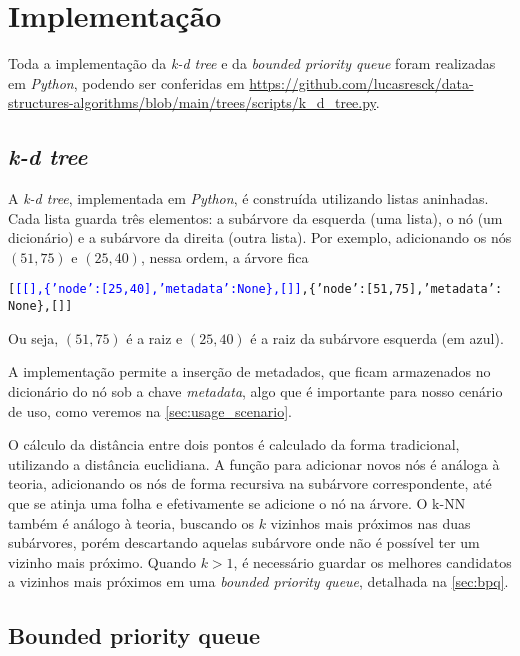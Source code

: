 \section{Implementação}

    Toda a implementação da \textit{k-d tree} e da \textit{bounded priority queue} foram realizadas em \textit{Python}, podendo ser conferidas em \url{https://github.com/lucasresck/data-structures-algorithms/blob/main/trees/scripts/k_d_tree.py}.

    \subsection{\textit{k-d tree}}

        A \textit{k-d tree}, implementada em \textit{Python}, é construída utilizando listas aninhadas. Cada lista guarda três elementos: a subárvore da esquerda (uma lista), o nó (um dicionário) e a subárvore da direita (outra lista). Por exemplo, adicionando os nós $(51, 75)$ e $(25, 40)$, nessa ordem, a árvore fica        
        \begin{alltt}
[\textcolor{blue}{[[], \{'node': [25, 40], 'metadata': None\}, []]}, \{'node': [51, 75], 'metadata':
None\}, []]
        \end{alltt}
        Ou seja, $(51, 75)$ é a raiz e $(25, 40)$ é a raiz da subárvore esquerda (em azul).

        A implementação permite a inserção de metadados, que ficam armazenados no dicionário do nó sob a chave \textit{metadata}, algo que é importante para nosso cenário de uso, como veremos na \autoref{sec:usage_scenario}.
        
        O cálculo da distância entre dois pontos é calculado da forma tradicional, utilizando a distância euclidiana. 
        A função para adicionar novos nós é análoga à teoria, adicionando os nós de forma recursiva na subárvore correspondente, até que se atinja uma folha e efetivamente se adicione o nó na árvore. O k-NN também é análogo à teoria, buscando os $k$ vizinhos mais próximos nas duas subárvores, porém descartando aquelas subárvore onde não é possível ter um vizinho mais próximo. Quando $k > 1$, é necessário guardar os melhores candidatos a vizinhos mais próximos em uma \textit{bounded priority queue}, detalhada na \autoref{sec:bpq}.

    \subsection{Bounded priority queue}
        \label{sec:bpq}

